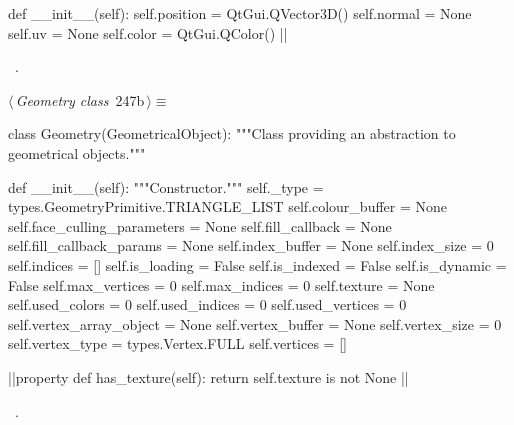 \documentclass[%
    a4paper,    %
    justified,  %
    nobib,      %
    openany     %
]{tufte-book}
\makeatletter
\renewcommand{\label}[1]{\@tufte@label{##1}}%
\makeatother
\begin{document}
\begin{fullwidth}
\begin{flushleft}
\begin{minipage}{\linewidth}
\begin{pythoncode}
    def __init__(self):
        self.position = QtGui.QVector3D()
        self.normal   = None
        self.uv       = None
        self.color    = QtGui.QColor()
|\NWsep|
\end{pythoncode}
\vspace{1.5ex}
\footnotesize
\begin{list}{}{\setlength{\itemsep}{-\parsep}\setlength{\itemindent}{-\leftmargin}}
\item \NWtxtMacroRefIn\ .

\item{}
\end{list}
\end{minipage}\vspace{4ex}
\end{flushleft}
\begin{flushleft} \small
\begin{minipage}{\linewidth}\label{scrap271}\raggedright\small
{} $\langle\,${\itshape Geometry class}\nobreak\ {\footnotesize {247b}}$\,\rangle\equiv$
\vspace{-1ex}
\begin{pythoncode}
class Geometry(GeometricalObject):
    """Class providing an abstraction to geometrical objects."""

    def __init__(self):
        """Constructor."""
        self._type                   = types.GeometryPrimitive.TRIANGLE_LIST
        self.colour_buffer           = None
        self.face_culling_parameters = None
        self.fill_callback           = None
        self.fill_callback_params    = None
        self.index_buffer            = None
        self.index_size              = 0
        self.indices                 = []
        self.is_loading              = False
        self.is_indexed              = False
        self.is_dynamic              = False
        self.max_vertices            = 0
        self.max_indices             = 0
        self.texture                 = None
        self.used_colors             = 0
        self.used_indices            = 0
        self.used_vertices           = 0
        self.vertex_array_object     = None
        self.vertex_buffer           = None
        self.vertex_size             = 0
        self.vertex_type             = types.Vertex.FULL
        self.vertices                = []

    |\normalfont{}\fontfamily{}|property
    def has_texture(self):
        return self.texture is not None
|\NWsep|
\end{pythoncode}
\vspace{1.5ex}
\footnotesize
\begin{list}{}{\setlength{\itemsep}{-\parsep}\setlength{\itemindent}{-\leftmargin}}
\item \NWtxtMacroRefIn\ .


\end{list}
\end{minipage}
\end{flushleft}
\end{fullwidth}
\end{document}

